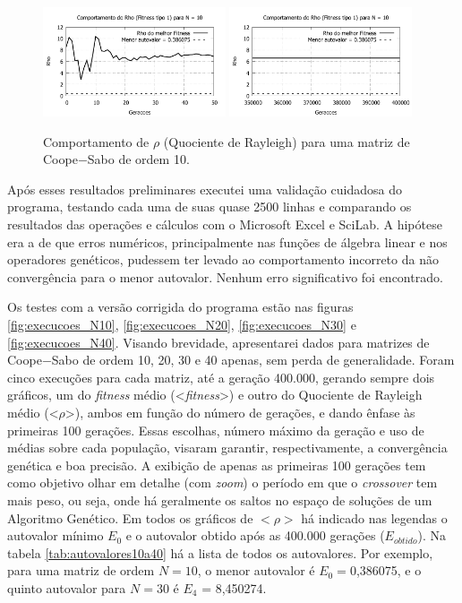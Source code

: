 	\begin{figure}[htbp]
		\centering
			\includegraphics[width=0.48\textwidth]{figs/resultados/rho_N10_g50.pdf}
			\includegraphics[width=0.48\textwidth]{figs/resultados/rho_N10_g400000.pdf}
		\caption{Comportamento de $\rho$ (Quociente de Rayleigh) para uma matriz de Coope$-$Sabo de ordem 10.}
		\label{fig:rho_N10}
	\end{figure}
	
	\newpage
	
	Após esses resultados preliminares executei uma validação cuidadosa do programa, testando cada uma de suas quase 2500 linhas e comparando os resultados das operações e cálculos com o Microsoft Excel e SciLab. A hipótese era a de que erros numéricos, principalmente nas funções de álgebra linear e nos operadores genéticos, pudessem ter levado ao comportamento incorreto da não convergência para o menor autovalor. Nenhum erro significativo foi encontrado.
	
	Os testes com a versão corrigida do programa estão nas figuras \ref{fig:execucoes_N10}, \ref{fig:execucoes_N20}, \ref{fig:execucoes_N30} e \ref{fig:execucoes_N40}. Visando brevidade, apresentarei dados para matrizes de Coope$-$Sabo de ordem 10, 20, 30 e 40 apenas, sem perda de generalidade. Foram cinco execuções para cada matriz, até a geração 400.000, gerando sempre dois gráficos, um do \textit{fitness} médio (<\textit{fitness}>) e outro do Quociente de Rayleigh médio (<$\rho$>), ambos em função do número de gerações, e dando ênfase às primeiras 100 gerações. Essas escolhas, número máximo da geração e uso de médias sobre cada população, visaram garantir, respectivamente, a convergência genética e boa precisão. A exibição de apenas as primeiras 100 gerações tem como objetivo olhar em detalhe (com \textit{zoom}) o período em que o \textit{crossover} tem mais peso, ou seja, onde há geralmente os saltos no espaço de soluções de um Algoritmo Genético. Em todos os gráficos de $<\rho>$ há indicado nas legendas o autovalor mínimo $E_0$ e o autovalor obtido após as 400.000 gerações ($E_{obtido}$). Na tabela \ref{tab:autovalores10a40} há a lista de todos os autovalores. Por exemplo, para uma matriz de ordem $N = 10$, o menor autovalor é $E_0 = $0,386075, e o quinto autovalor para $N = 30$ é $E_4$ = 8,450274.

